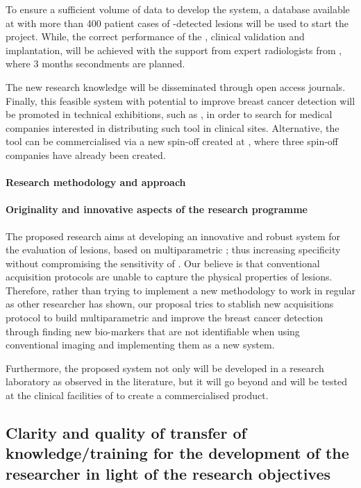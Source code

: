 To ensure a sufficient volume of data to develop the \cad system, a database available at \florida with more than 400 patient cases of \mri-detected \nmle lesions will be used to start the project. While, the correct performance of the \cad, clinical validation and implantation, will be achieved with the support from expert radiologists from \udiat, where 3 months secondments are planned.

The new research knowledge will be disseminated through open access journals. Finally, this feasible \cad system with potential to improve breast cancer detection will be promoted in technical exhibitions, such as \ecr, in order to search for medical companies interested in distributing such tool in clinical sites. Alternative, the tool can be commercialised via a new spin-off created at \vicorob, where three spin-off companies have already been created.

\paragraph{Research methodology and approach}
\paragraph{Originality and innovative aspects of the research programme}

The proposed research aims at developing an innovative and robust \cad system for the evaluation of \nmle lesions, based on multiparametric \mri; thus increasing specificity without compromising the sensitivity of \cemri.
Our believe is that conventional \mri acquisition protocols are unable to capture the physical properties of \nmle lesions.
Therefore, rather than trying to implement a new \cad methodology to work in regular \mri as other researcher has shown,
our proposal tries to stablish new \mri acquisitions protocol to build multiparametric \mri and improve the breast cancer detection through finding new bio-markers that are not identifiable when using conventional imaging and implementing them as a new \cad system.

Furthermore, the proposed \cad system not only will be developed in a research laboratory as observed in the literature, but it will go beyond and will be tested at the clinical facilities of \udiat to create a commercialised product.

\subsection{Clarity and quality of transfer of knowledge/training for the development of the researcher in light of the research objectives}
\label{sec:transfer}

